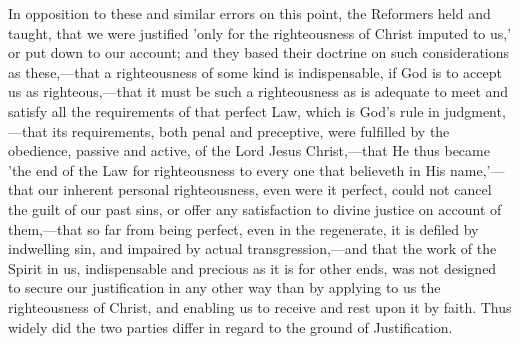 \documentclass[
]{book}
\begin{document}
In opposition to these and similar errors on this point, the Reformers held and taught, that we were justified 'only for the righteousness of Christ imputed to us,' or put down to our account; and they based their doctrine on such considerations as these,---that a righteousness of some kind is indispensable, if God is to accept us as righteous,---that it must be such a righteousness as is adequate to meet and satisfy all the requirements of that perfect Law, which is God's rule in judgment,---that its requirements, both penal and preceptive, were fulfilled by the obedience, passive and active, of the Lord Jesus Christ,---that He thus became 'the end of the Law for righteousness to every one that believeth in His name,'---that our inherent personal righteousness, even were it perfect, could not cancel the guilt of our past sins, or offer any satisfaction to divine justice on account of them,---that so far from being perfect, even in the regenerate, it is defiled by indwelling sin, and impaired by actual transgression,---and that the work of the Spirit in us, indispensable and precious as it is for other ends, was not designed to secure our justification in any other way than by applying to us the righteousness of Christ, and enabling us to receive and rest upon it by faith. Thus widely did the two parties differ in regard to the ground of Justification.
\end{document}
